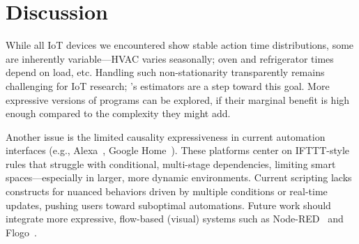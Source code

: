 \vspace{-0.3cm}

\section{Discussion} 

While all IoT devices we encountered show stable action time distributions, some are inherently variable---HVAC varies seasonally; oven and refrigerator times depend on load, etc. Handling such non-stationarity transparently remains challenging for IoT research; \sysname’s estimators are a step toward this goal. More expressive versions of \sysname{} programs 
can be explored, if their marginal benefit is high enough compared to the complexity they might add. 



Another issue is the limited causality expressiveness in current automation interfaces (e.g., Alexa~\cite{Alexa}, Google Home~\cite{GoogleHome}).
These platforms center on IFTTT-style~\cite{ifttt} rules that struggle with conditional, multi-stage dependencies, limiting smart spaces---especially in larger, more dynamic environments. Current scripting lacks constructs for nuanced behaviors driven by multiple conditions or real-time updates, pushing users toward suboptimal automations. Future work should integrate more expressive, flow-based (visual) systems such as Node-RED~\cite{NodeRED} and Flogo~\cite{flogo}.
